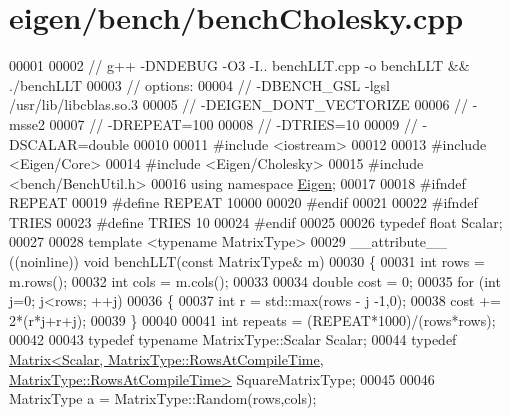 \hypertarget{eigen_2bench_2bench_cholesky_8cpp_source}{}\section{eigen/bench/bench\+Cholesky.cpp}
\label{eigen_2bench_2bench_cholesky_8cpp_source}

\begin{DoxyCode}
00001 
00002 \textcolor{comment}{// g++ -DNDEBUG -O3 -I.. benchLLT.cpp  -o benchLLT && ./benchLLT}
00003 \textcolor{comment}{// options:}
00004 \textcolor{comment}{//  -DBENCH\_GSL -lgsl /usr/lib/libcblas.so.3}
00005 \textcolor{comment}{//  -DEIGEN\_DONT\_VECTORIZE}
00006 \textcolor{comment}{//  -msse2}
00007 \textcolor{comment}{//  -DREPEAT=100}
00008 \textcolor{comment}{//  -DTRIES=10}
00009 \textcolor{comment}{//  -DSCALAR=double}
00010 
00011 \textcolor{preprocessor}{#include <iostream>}
00012 
00013 \textcolor{preprocessor}{#include <Eigen/Core>}
00014 \textcolor{preprocessor}{#include <Eigen/Cholesky>}
00015 \textcolor{preprocessor}{#include <bench/BenchUtil.h>}
00016 \textcolor{keyword}{using namespace }\hyperlink{namespace_eigen}{Eigen};
00017 
00018 \textcolor{preprocessor}{#ifndef REPEAT}
00019 \textcolor{preprocessor}{#define REPEAT 10000}
00020 \textcolor{preprocessor}{#endif}
00021 
00022 \textcolor{preprocessor}{#ifndef TRIES}
00023 \textcolor{preprocessor}{#define TRIES 10}
00024 \textcolor{preprocessor}{#endif}
00025 
00026 \textcolor{keyword}{typedef} \textcolor{keywordtype}{float} Scalar;
00027 
00028 \textcolor{keyword}{template} <\textcolor{keyword}{typename} MatrixType>
00029 \_\_attribute\_\_ ((noinline)) \textcolor{keywordtype}{void} benchLLT(\textcolor{keyword}{const} MatrixType& m)
00030 \{
00031   \textcolor{keywordtype}{int} rows = m.rows();
00032   \textcolor{keywordtype}{int} cols = m.cols();
00033 
00034   \textcolor{keywordtype}{double} cost = 0;
00035   \textcolor{keywordflow}{for} (\textcolor{keywordtype}{int} j=0; j<rows; ++j)
00036   \{
00037     \textcolor{keywordtype}{int} r = std::max(rows - j -1,0);
00038     cost += 2*(r*j+r+j);
00039   \}
00040 
00041   \textcolor{keywordtype}{int} repeats = (REPEAT*1000)/(rows*rows);
00042 
00043   \textcolor{keyword}{typedef} \textcolor{keyword}{typename} MatrixType::Scalar Scalar;
00044   \textcolor{keyword}{typedef} 
      \hyperlink{group___core___module_class_eigen_1_1_matrix}{Matrix<Scalar, MatrixType::RowsAtCompileTime, MatrixType::RowsAtCompileTime>}
       SquareMatrixType;
00045 
00046   MatrixType a = MatrixType::Random(rows,cols);

\end{DoxyCode}
